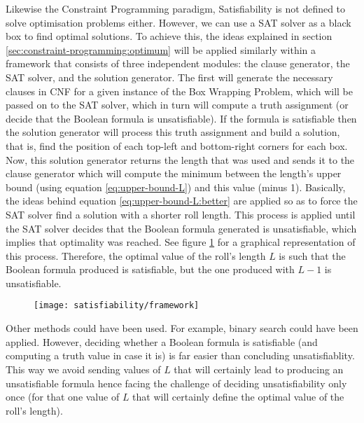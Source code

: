 Likewise the Constraint Programming paradigm, Satisfiability is not defined to solve
optimisation problems either. However, we can use a SAT solver as a black box to find
optimal solutions. To achieve this, the ideas explained in section
\ref{sec:constraint-programming:optimum} will be applied similarly within a framework
that consists of three independent modules: the clause generator,
the SAT solver, and the solution generator. The first will generate the necessary
clauses in CNF for a given instance of the Box Wrapping Problem, which will be passed
on to the SAT solver, which in turn will compute a truth assignment (or decide that the
Boolean formula is unsatisfiable). If the formula is satisfiable then the solution
generator will process this truth assignment and build a solution, that is, find
the position of each top-left and bottom-right corners for each box. Now, this
solution generator returns the length that was used and sends it to the clause generator
which will compute the minimum between the length's upper bound (using equation
\ref{eq:upper-bound-L}) and this value (minus 1). Basically, the ideas behind equation
\ref{eq:upper-bound-L:better} are applied so as to force the SAT solver find a solution
with a shorter roll length. This process is applied until the SAT solver decides that
the Boolean formula generated is unsatisfiable, which implies that optimality was reached.
See figure \ref{fig:satisfiability:framework} for a graphical representation of this
process. Therefore, the optimal value of the roll's length $L$ is such that the Boolean
formula produced is satisfiable, but the one produced with $L - 1$ is unsatisfiable.

\begin{figure}[H]
	\centering
	\texttt{[image: satisfiability/framework]}
	\label{fig:satisfiability:framework}
\end{figure}

Other methods could have been used. For example, binary search could have been applied.
However, deciding whether a Boolean formula is satisfiable (and computing a
truth value in case it is) is far easier than concluding unsatisfiablity. This way
we avoid sending values of $L$ that will certainly lead to producing an unsatisfiable
formula hence facing the challenge of deciding unsatisfiability only once (for that
one value of $L$ that will certainly define the optimal value of the roll's length).

